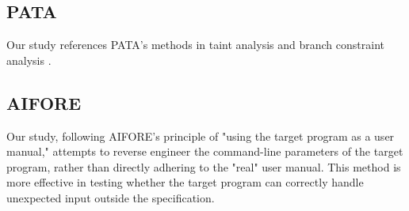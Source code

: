 \subsection{PATA}




Our study references PATA's methods in taint analysis and branch constraint analysis \cite{liang2022pata}.


\subsection{AIFORE}
\label{subsec:aifore}



Our study, following AIFORE's principle of "using the target program as a user manual," \cite{shi2023aifore} attempts to reverse engineer the command-line parameters of the target program, rather than directly adhering to the "real" user manual. This method is more effective in testing whether the target program can correctly handle unexpected input outside the specification.

\fi